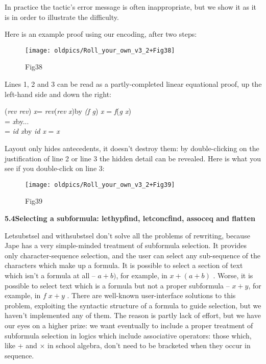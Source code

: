 \documentclass[11pt]{book}
\newcommand{\tab}{\hspace{5mm}}
\begin{document}
\tab In practice the tactic's error message is often inappropriate, but we show it as it is in order to illustrate the difficulty.


Here is an example proof using our encoding, after two steps:

\begin{figure}[htbp] \begin{center} \texttt{[image: oldpics/Roll\_your\_own\_v3\_2+Fig38]} \caption{Fig38} \end{center} \end{figure}


Lines 1, 2 and 3 can be read as a partly-completed linear equational proof, up the left-hand side and down the right:

(\textit{rev {\textbullet} rev}) \textit{x}\tab = \textit{rev}(\textit{rev} \textit{x})\tab by \textit{(f {\textbullet} g}) \textit{x} = \textit{f}(\textit{g x})\\
= \textit{x}\tab by...\\
= \textit{id x}\tab by \textit{id x} = \textit{x}


Layout only hides antecedents, it doesn't destroy them: by double-clicking on the justification of line 2 or line 3 the hidden detail can be revealed. Here is what you see if you double-click on line 3:

\begin{figure}[htbp] \begin{center} \texttt{[image: oldpics/Roll\_your\_own\_v3\_2+Fig39]} \caption{Fig39} \end{center} \end{figure}


\textbf{5.4\tab Selecting a subformula: lethypfind, letconcfind, assoceq and flatten}


Letsubstsel and withsubstsel don't solve all the problems of rewriting, because Jape has a very simple-minded treatment of subformula selection. It provides only character-sequence selection, and the user can select any sub-sequence of the characters which make up a formula. It is possible to select a section of text which isn't a formula at all -- $a+b)$, for example, in $x+(a+b)$ . Worse, it is possible to select text which is a formula but not a proper subformula -- $x+y$, for example, in $f\;x+y$ . There are well-known user-interface solutions to this problem, exploiting the syntactic structure of a formula to guide selection, but we haven't implemented any of them. The reason is partly lack of effort, but we have our eyes on a higher prize: we want eventually to include a proper treatment of subformula selection in logics which include associative operators: those which, like + and \ensuremath{\times} in school algebra, don't need to be bracketed when they occur in sequence.
\end{document}
